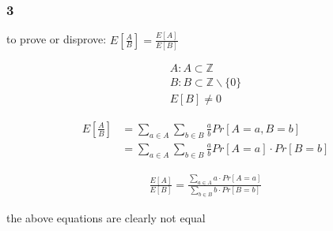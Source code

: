 \subsubsection*{  3 }

to prove or disprove: $E\left[\frac{A}{B}\right]=\frac{E\left[A\right]}{E\left[B\right]}$

\begin{align*}
A:A\subset \mathbb{Z}\\
B:B\subset \mathbb{Z}\backslash\{0\}\\
E\left[B\right]\ne 0
\end{align*}

\begin{align*}
E\left[\frac{A}{B}\right]&=\sum_{{a\in A}}\sum_{{b\in B}}\frac{a}{b}Pr\left[A=a,B=b\right]\\
&=\sum_{{a\in A}}\sum_{{b\in B}}\frac{a}{b}Pr\left[A=a\right]\cdot Pr\left[B=b\right]
\end{align*}

\begin{align*}
\frac{E\left[A\right]}{E\left[B\right]}=\frac{\sum_{{a\in A}}a\cdot Pr\left[A=a\right]}{\sum_{{b\in B}}b\cdot Pr\left[B=b\right]}
\end{align*}

the above equations are clearly not equal